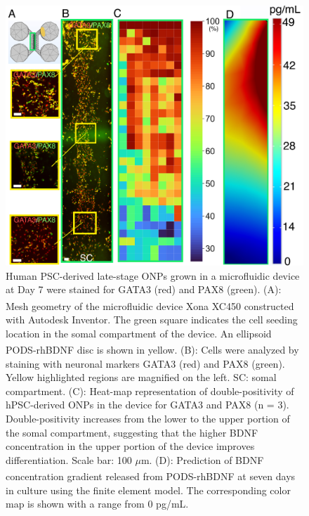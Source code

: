 \documentclass[review]{elsarticle}
\begin{document}
\begin{figure}
	\begin{center}
		\includegraphics[width=13cm]{Fig_7.jpg}
	\end{center}
	\caption{Human PSC-derived late-stage ONPs grown in a microfluidic device at Day 7 were stained for GATA3 (red) and PAX8 (green). (A): Mesh geometry of the microfluidic device Xona\textsuperscript{\texttrademark} XC450 constructed with Autodesk Inventor. The green square indicates the cell seeding location in the somal compartment of the device. An ellipsoid PODS\textsuperscript{\textregistered}-rhBDNF disc is shown in yellow. (B): Cells were analyzed by staining with neuronal markers GATA3 (red) and PAX8 (green). Yellow highlighted regions are magnified on the left. SC: somal compartment. (C): Heat-map representation of double-positivity of hPSC-derived ONPs in the device for GATA3 and PAX8 (n = 3). Double-positivity increases from the lower to the upper portion of the somal compartment, suggesting that the higher BDNF concentration in the upper portion of the device improves differentiation. Scale bar: 100 $\mu$m. (D): Prediction of BDNF concentration gradient released from PODS\textsuperscript{\textregistered}-rhBDNF at seven days in culture using the finite element model.  The corresponding color map is shown with a range from 0 pg/mL.
	}
\end{figure}
\end{document}
